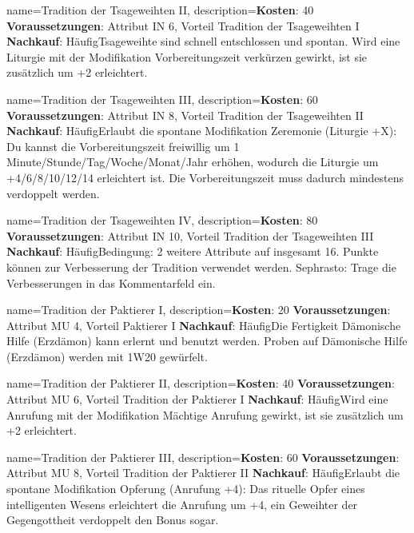 {
    name={Tradition der Tsageweihten II},
    description={\textbf{Kosten}: 40 \textbf{Voraussetzungen}: Attribut IN 6, Vorteil Tradition der Tsageweihten I \textbf{Nachkauf}: Häufig\newline Tsageweihte sind schnell entschlossen und spontan. Wird eine Liturgie mit der Modifikation Vorbereitungszeit verkürzen gewirkt, ist sie zusätzlich um +2 erleichtert.}
}


{
    name={Tradition der Tsageweihten III},
    description={\textbf{Kosten}: 60 \textbf{Voraussetzungen}: Attribut IN 8, Vorteil Tradition der Tsageweihten II \textbf{Nachkauf}: Häufig\newline Erlaubt die spontane Modifikation Zeremonie (Liturgie +X): Du kannst die Vorbereitungszeit freiwillig um 1 Minute/Stunde/Tag/Woche/Monat/Jahr erhöhen, wodurch die Liturgie um +4/6/8/10/12/14 erleichtert ist. Die Vorbereitungszeit muss dadurch mindestens verdoppelt werden.}
}


{
    name={Tradition der Tsageweihten IV},
    description={\textbf{Kosten}: 80 \textbf{Voraussetzungen}: Attribut IN 10, Vorteil Tradition der Tsageweihten III \textbf{Nachkauf}: Häufig\newline Bedingung: 2 weitere Attribute auf insgesamt 16. Punkte können zur Verbesserung der Tradition verwendet werden. Sephrasto: Trage die Verbesserungen in das Kommentarfeld ein.}
}


{
    name={Tradition der Paktierer I},
    description={\textbf{Kosten}: 20 \textbf{Voraussetzungen}: Attribut MU 4, Vorteil Paktierer I \textbf{Nachkauf}: Häufig\newline Die Fertigkeit Dämonische Hilfe (Erzdämon) kann erlernt und benutzt werden. Proben auf Dämonische Hilfe (Erzdämon) werden mit 1W20 gewürfelt.}
}


{
    name={Tradition der Paktierer II},
    description={\textbf{Kosten}: 40 \textbf{Voraussetzungen}: Attribut MU 6, Vorteil Tradition der Paktierer I \textbf{Nachkauf}: Häufig\newline Wird eine Anrufung mit der Modifikation Mächtige Anrufung gewirkt, ist sie zusätzlich um +2 erleichtert.}
}


{
    name={Tradition der Paktierer III},
    description={\textbf{Kosten}: 60 \textbf{Voraussetzungen}: Attribut MU 8, Vorteil Tradition der Paktierer II \textbf{Nachkauf}: Häufig\newline Erlaubt die spontane Modifikation Opferung (Anrufung +4): Das rituelle Opfer eines intelligenten Wesens erleichtert die Anrufung um +4, ein Geweihter der Gegengottheit verdoppelt den Bonus sogar.}
}


